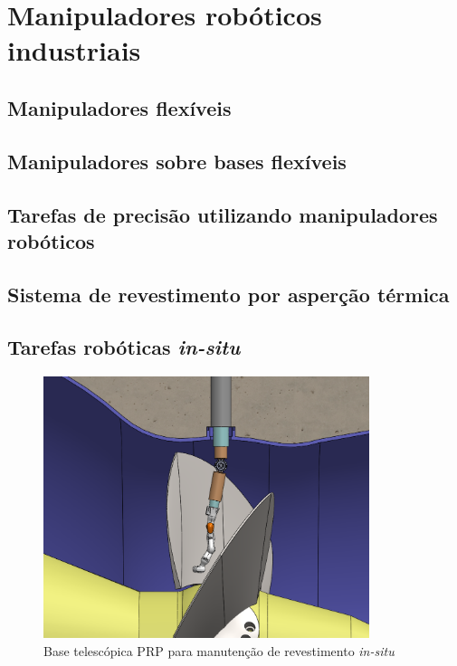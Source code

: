 \section{Manipuladores robóticos industriais}\label{sec::manind}

\subsection{Manipuladores flexíveis}

\subsection{Manipuladores sobre bases flexíveis}

\subsection{Tarefas de precisão utilizando manipuladores robóticos}

\subsection{Sistema de revestimento por asperção térmica} \label{sec::hvof}

\subsection{Tarefas robóticas \textit{in-situ}} \label{sec::insitu}

\lipsum[1-1]

\begin{figure}[h]
	\centering 
 	\includegraphics[width=0.85\textwidth]{figs/base_telesc_turbina}
 	\caption{Base telescópica PRP para manutenção de revestimento
 	\textit{in-situ}}
 	\label{fig::base_telesc_turbina}
\end{figure}

